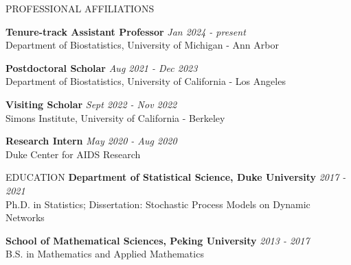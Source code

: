 \documentclass{resume} %
\begin{document}

\begin{rSection}{PROFESSIONAL AFFILIATIONS}
	
{\bf Tenure-track Assistant Professor} \hfill {\em Jan 2024  -  present} 
\\ {\small Department of Biostatistics, University of Michigan - Ann Arbor}
	
{\bf Postdoctoral Scholar} \hfill {\em Aug 2021 - Dec 2023} 
\\ {\small Department of Biostatistics, University of California - Los Angeles}

{\bf Visiting Scholar} \hfill {\em Sept 2022 - Nov 2022} 
\\ {\small Simons Institute, University of California - Berkeley}


{\bf Research Intern} \hfill {\em May 2020 - Aug 2020} 
\\ { \small Duke Center for AIDS Research}
\end{rSection}

\begin{rSection}{EDUCATION}
{\bf Department of Statistical Science, Duke University} \hfill {\em 2017 - 2021} 
\\ Ph.D. in Statistics; Dissertation: Stochastic Process Models on Dynamic Networks

{\bf School of Mathematical Sciences, Peking University} \hfill {\em 2013 - 2017} 
\\ B.S. in Mathematics and Applied Mathematics
\end{rSection}

%
%




\end{document}
